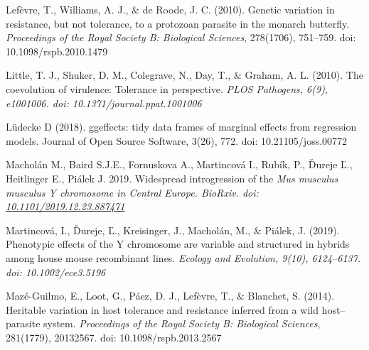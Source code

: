\documentclass[12pt]{article}
\renewcommand{\_}{\kern-1.5pt\textunderscore\kern-1.5pt}
\begin{document}
\begin{FlushLeft}
Lefèvre, T., Williams, A. J., $\&$  de Roode, J. C. (2010). Genetic variation in resistance, but not tolerance, to a protozoan parasite in the monarch butterfly. \textit{Proceedings of the Royal Society B: Biological Sciences}, 278(1706), 751–759. doi: 10.1098/rspb.2010.1479
\end{FlushLeft}\par

\begin{FlushLeft}
Little, T. J., Shuker, D. M., Colegrave, N., Day, T., $\&$  Graham, A. L. (2010). The coevolution of virulence: Tolerance in perspective. \textit{PLOS Pathogens, 6(9), e1001006. doi: 10.1371/journal.ppat.1001006}
\end{FlushLeft}\par

\begin{FlushLeft}
Lüdecke D (2018). ggeffects: tidy data frames of marginal effects from regression models. Journal of Open Source Software, 3(26), 772. doi: 10.21105/joss.00772
\end{FlushLeft}\par

\textcolor[HTML]{00000A}{Macholán M., Baird S.J.E., Fornuskova A., Martincová I., Rubík, P., Ďureje Ľ., Heitlinger E., Piálek J. 2019. Widespread introgression of the \textit{Mus musculus musculus Y chromosome in Central Europe. BioRxiv. doi:\href{http://dx.doi.org/10.1101/2019.12.23.887471}{ }\href{http://dx.doi.org/10.1101/2019.12.23.887471}{10.1101/2019.12.23.887471}}}\par

\begin{FlushLeft}
Martincová, I., Ďureje, Ľ., Kreisinger, J., Macholán, M., $\&$  Piálek, J. (2019). Phenotypic effects of the Y chromosome are variable and structured in hybrids among house mouse recombinant lines. \textit{Ecology and Evolution, 9(10), 6124–6137. doi: 10.1002/ece3.5196}
\end{FlushLeft}\par

\begin{FlushLeft}
Mazé-Guilmo, E., Loot, G., Páez, D. J., Lefèvre, T., $\&$  Blanchet, S. (2014). Heritable variation in host tolerance and resistance inferred from a wild host–parasite system. \textit{Proceedings of the Royal Society B: Biological Sciences}, 281(1779), 20132567. doi: 10.1098/rspb.2013.2567
\end{FlushLeft}\par
\end{document}
